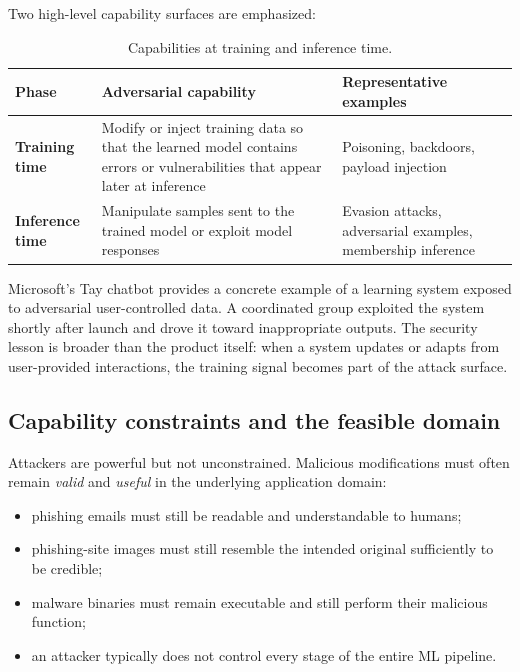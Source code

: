 \documentclass[11pt,a4paper]{report}
\begin{document}
Two high-level capability surfaces are emphasized:

\begin{table}[H]
\centering
\caption{Capabilities at training and inference time.}
\label{tab:capabilities}
\begin{tabularx}{\textwidth}{>{\bfseries}p{}X X}
\toprule
\rowcolor{Primary}
\color{white}Phase & \color{white}Adversarial capability & \color{white}Representative examples \\
\midrule
Training time & Modify or inject training data so that the learned model contains errors or vulnerabilities that appear later at inference & Poisoning, backdoors, payload injection \\
Inference time & Manipulate samples sent to the trained model or exploit model responses & Evasion attacks, adversarial examples, membership inference \\
\bottomrule
\end{tabularx}
\end{table}

\begin{examplebox}[title={Training-time manipulation: Microsoft Tay}]
Microsoft's Tay chatbot provides a concrete example of a learning system exposed to adversarial user-controlled data. A coordinated group exploited the system shortly after launch and drove it toward inappropriate outputs. The security lesson is broader than the product itself: when a system updates or adapts from user-provided interactions, the training signal becomes part of the attack surface.
\end{examplebox}

\subsection{Capability constraints and the feasible domain}

Attackers are powerful but not unconstrained. Malicious modifications must often remain \emph{valid} and \emph{useful} in the underlying application domain:
\begin{itemize}
  \item phishing emails must still be readable and understandable to humans;
  \item phishing-site images must still resemble the intended original sufficiently to be credible;
  \item malware binaries must remain executable and still perform their malicious function;
  \item an attacker typically does not control every stage of the entire ML pipeline.
\end{itemize}
\end{document}
